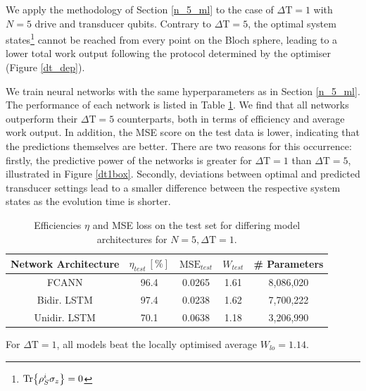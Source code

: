 We apply the methodology of Section \ref{n_5_ml} to the case of $\Delta \mathrm{T} = 1$ with $N=5$ drive and transducer qubits.
Contrary to $\Delta \mathrm{T} = 5$, the optimal system states\footnote{$\Tr{\rho_S^i \sigma_z} = 0$} cannot be reached from every point on the Bloch sphere, leading to a lower total work output following the protocol determined by the optimiser (Figure \ref{dt_dep}).

We train neural networks with the same hyperparameters as in Section \ref{n_5_ml}.
The performance of each network is listed in Table \ref{effdt1}.
We find that all networks outperform their $\Delta \mathrm{T} = 5$ counterparts, both in terms of efficiency and average work output.
In addition, the MSE score on the test data is lower, indicating that the predictions themselves are better.
There are two reasons for this occurrence: firstly, the predictive power of the networks is greater for $\Delta \mathrm{T} = 1$ than $\Delta \mathrm{T} = 5$, illustrated in Figure \ref{dt1box}.
Secondly, deviations between optimal and predicted transducer settings lead to a smaller difference between the respective system states as the evolution time is shorter.

\begin{table}[h]
	\centering
	\begin{tabular}{ c | c | c | c | c }
		Network Architecture & $\eta_{test} \ [\%]$ & $\mathrm{MSE}_{test}$  & $W_{test}$ & \# Parameters \\
		\hline
		FCANN        & 96.4 & 0.0265 & 1.61 & 8,086,020 \\
		Bidir. LSTM  & 97.4 & 0.0238 & 1.62 & 7,700,222 \\
		Unidir. LSTM & 70.1 & 0.0638 & 1.18 & 3,206,990 \\
	\end{tabular}
	\caption{Efficiencies $\eta$ and MSE loss on the test set for differing model architectures for $N=5, \Delta \mathrm{T} = 1$.}
	\label{effdt1}
\end{table}

For $\Delta \mathrm{T} = 1$, all models beat the locally optimised average $W_{lo} = 1.14$.


